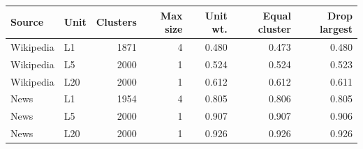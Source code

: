 \begin{tabular}{llrrrrr}
\toprule
Source & Unit & Clusters & Max size & Unit wt. & Equal cluster & Drop largest \\
\midrule
Wikipedia & L1 & 1871 & 4 & 0.480 & 0.473 & 0.480 \\
Wikipedia & L5 & 2000 & 1 & 0.524 & 0.524 & 0.523 \\
Wikipedia & L20 & 2000 & 1 & 0.612 & 0.612 & 0.611 \\
News & L1 & 1954 & 4 & 0.805 & 0.806 & 0.805 \\
News & L5 & 2000 & 1 & 0.907 & 0.907 & 0.906 \\
News & L20 & 2000 & 1 & 0.926 & 0.926 & 0.926 \\
\bottomrule
\end{tabular}
